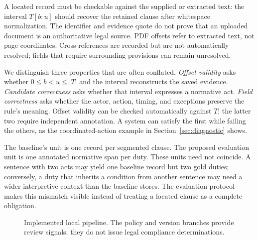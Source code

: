 \documentclass[11pt,a4paper]{article}
\begin{document}
A located record must be checkable against the supplied or extracted text: the interval $T[b:u]$ should recover the retained clause after whitespace normalization. The identifier and evidence quote do not prove that an uploaded document is an authoritative legal source. PDF offsets refer to extracted text, not page coordinates. Cross-references are recorded but are not automatically resolved; fields that require surrounding provisions can remain unresolved.

We distinguish three properties that are often conflated. \emph{Offset validity} asks whether $0\leq b<u\leq |T|$ and the interval reconstructs the saved evidence. \emph{Candidate correctness} asks whether that interval expresses a normative act. \emph{Field correctness} asks whether the actor, action, timing, and exceptions preserve the rule's meaning. Offset validity can be checked automatically against $T$; the latter two require independent annotation. A system can satisfy the first while failing the others, as the coordinated-action example in Section~\ref{sec:diagnostic} shows.

The baseline's unit is one record per segmented clause. The proposed evaluation unit is one annotated normative span per duty. These units need not coincide. A sentence with two acts may yield one baseline record but two gold duties; conversely, a duty that inherits a condition from another sentence may need a wider interpretive context than the baseline stores. The evaluation protocol makes this mismatch visible instead of treating a located clause as a complete obligation.

\begin{figure}[t]
\centering
{}
\caption{Implemented local pipeline. The policy and version branches provide review signals; they do not issue legal compliance determinations.}
\label{fig:pipeline}
\end{figure}
\end{document}
